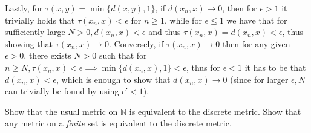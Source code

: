 \begin{solution}
     Lastly, for $\tau(x, y) = \min\{d(x, y), 1\}$, if $d(x_n, x) \rightarrow 0$, then for $\epsilon > 1$ it trivially holds that $\tau(x_n, x) < \epsilon$ for $n \geq 1$, while for $\epsilon \leq 1$ we have that for sufficiently large $N > 0, d(x_n, x) < \epsilon$ and thus $\tau(x_n, x) = d(x_n, x) < \epsilon$, thus showing that $\tau(x_n, x) \rightarrow 0$.
     Conversely, if $\tau(x_n, x) \rightarrow 0$ then for any given $\epsilon > 0$, there exists $N > 0$ such that for $n \geq N, \tau(x_n, x) < \epsilon \implies \min\{d(x_n, x), 1\} < \epsilon$, thus for $\epsilon < 1$ it has to be that $d(x_n, x) < \epsilon$, which is enough to show that $d(x_n, x) \rightarrow 0$ (since for larger $\epsilon, N$ can trivially be found by using $\epsilon' < 1$).
\end{solution}

\begin{exercise}{43}
    Show that the usual metric on $\mathbb{N}$ is equivalent to the discrete metric.
    Show that any metric on a \textit{finite} set is equivalent to the discrete metric.
\end{exercise}

